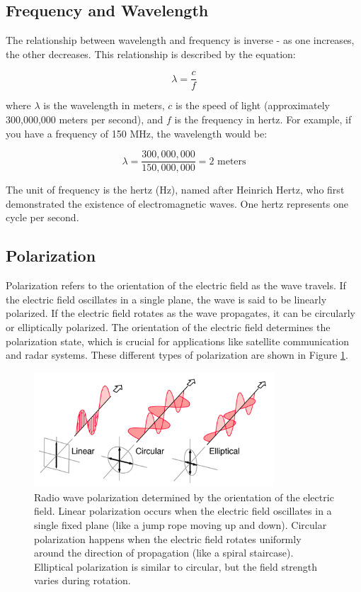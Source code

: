 \subsection{Frequency and Wavelength}
The relationship between wavelength and frequency is inverse - as one increases, the other decreases. This relationship is described by the equation:

\begin{equation}
\lambda = \frac{c}{f}
\label{eq:wavelength}
\end{equation}

where \(\lambda\) is the wavelength in meters, \(c\) is the speed of light (approximately 300,000,000 meters per second), and \(f\) is the frequency in hertz. For example, if you have a frequency of 150 MHz, the wavelength would be:

\[
\lambda = \frac{300,000,000}{150,000,000} = 2 \text{ meters}
\]

The unit of frequency is the hertz (Hz), named after Heinrich Hertz, who first demonstrated the existence of electromagnetic waves. One hertz represents one cycle per second.

\subsection{Polarization}
Polarization refers to the orientation of the electric field as the wave travels. If the electric field oscillates in a single plane, the wave is said to be linearly polarized. If the electric field rotates as the wave propagates, it can be circularly or elliptically polarized. The orientation of the electric field determines the polarization state, which is crucial for applications like satellite communication and radar systems. These different types of polarization are shown in Figure \ref{fig:polarization}.

\begin{figure}[h]
    \centering
    \includegraphics[width=0.8\textwidth]{images/polarization.png}
    \caption{Radio wave polarization determined by the orientation of the electric field. Linear polarization occurs when the electric field oscillates in a single fixed plane (like a jump rope moving up and down). Circular polarization happens when the electric field rotates uniformly around the direction of propagation (like a spiral staircase). Elliptical polarization is similar to circular, but the field strength varies during rotation.}
    \label{fig:polarization}
\end{figure}

